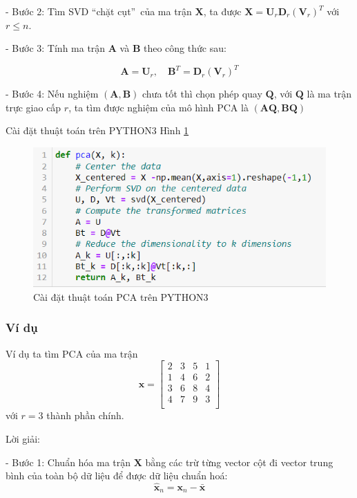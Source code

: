 \documentclass[12pt,a4paper,oneside]{report}
\numberwithin{equation}{section}
\begin{document}
- Bước 2: Tìm SVD \textquotedblleft chặt cụt\textquotedblright\ của ma trận $\mathbf{X}$, ta được $\mathbf{X}=\mathbf{U}_{r} \mathbf{D}_{r}\left(\mathbf{V}_{r}\right)^{T}$ với $r \leq n$.

- Bước 3: Tính ma trận $\mathbf{A}$ và $\mathbf{B}$ theo công thức sau:

$$
\mathbf{A} =  \mathbf{U}_{r}, \quad \mathbf{B}^{T}= \mathbf{D}_{r}\left(\mathbf{V}_{r}\right)^{T}
$$

- Bước 4: Nếu nghiệm $(\mathbf{A, B})$ chưa tốt thì chọn phép quay $\mathbf{Q}$, với $\mathbf{Q}$ là ma trận trực giao cấp $r$, ta tìm được nghiệm của mô hình $\mathrm{PCA}$ là $(\mathbf{A Q, B Q})$

Cài đặt thuật toán trên PYTHON3 Hình \ref{fig:pca_algo} 
\newpage
\begin{figure}[htp]
	\centering
	\includegraphics[scale=0.8]{implement_pca.png}
\caption{ Cài đặt thuật toán PCA trên PYTHON3}
\label{fig:pca_algo}
\end{figure}

\subsubsection{Ví dụ}
Ví dụ ta tìm PCA của ma trận\[
\mathbf{x} = \begin{bmatrix}
	2 & 3 & 5 & 1 \\
	1 & 4 & 6 & 2 \\
	3 & 6 & 8 & 4 \\
	4 & 7 & 9 & 3 \\
\end{bmatrix}
\] với $r=3$ thành phần chính.

Lời giải:

- Bước 1: Chuẩn hóa ma trận $\mathbf{X}$ bằng các trừ từng vector cột đi vector trung bình của toàn bộ dữ liệu để được dữ
liệu chuẩn hoá:
\begin{equation}
	\hat{\mathbf{x}}_n = \mathbf{x}_n - \bar{\mathbf{x}}
\end{equation}
\end{document}
